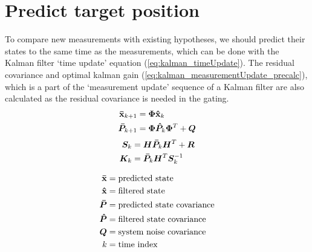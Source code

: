 \section{Predict target position}
To compare new measurements with existing hypotheses, we should predict their states to the same time as the measurements, which can be done with the Kalman filter `time update' equation (\ref{eq:kalman_timeUpdate}). The residual covariance and optimal kalman gain (\ref{eq:kalman_measurementUpdate_precalc}), which is a part of the `measurement update' sequence of a Kalman filter are also calculated as the residual covariance is needed in the gating.
\begin{equation}\label{eq:kalman_timeUpdate}
\begin{split}
\boldsymbol{\mathbf{\bar{x}}}_{k+1} 	&= \bm{\Phi} \boldsymbol{\mathbf{\hat{x}}}_k \\
\bm{\bar{P}}_{k+1}	&= \bm{\Phi} \bm{\hat{P}}_k  \bm{\Phi}^T + \bm{Q} \\
\end{split}
\end{equation}
\begin{equation}\label{eq:kalman_measurementUpdate_precalc}
\begin{split}
\bm{S}_k	&= \bm{H}\bm{\bar{P}}_k \bm{H}^T + \bm{R} \\
\bm{K}_k &= \bm{\bar{P}}_k \bm{H}^T \bm{S}_k^{-1} \\
\end{split}
\end{equation}

\begin{equation*}
\begin{split}
\boldsymbol{\mathbf{\bar{x}}}	&= \text{predicted state} \\
\boldsymbol{\mathbf{\hat{x}}} &= \text{filtered state} \\
\bm{\bar{P}} &= \text{predicted state covariance} \\
\bm{\hat{P}} &= \text{filtered state covariance} \\
\bm{Q}		&= \text{system noise covariance} \\
k  			&= \text{time index} \\
\end{split}
\end{equation*}

